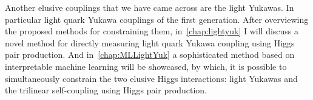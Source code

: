 \par Another elusive couplings that we have came across are the light Yukawas. In particular light quark Yukawa couplings of the first generation. After overviewing the proposed methods for constraining them, in~\autoref{chap:lightyuk} I will discuss a novel method for directly measuring light quark Yukawa coupling using Higgs pair production. And in~\autoref{chap:MLLightYuk} a sophisticated method based on interpretable machine learning will be showcased, by which, it is possible to simultaneously constrain the two elusive Higgs interactions: light Yukawas and the trilinear self-coupling using Higgs pair production.
